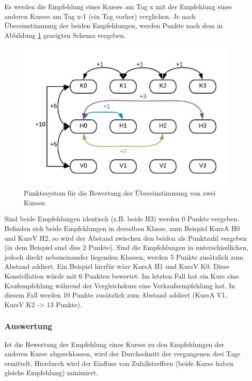 Es werden die Empfehlung eines Kurses am Tag x mit der Empfehlung eines anderen Kurses am Tag x-1 (ein Tag vorher) verglichen. Je nach Übereinstimmung der beiden Empfehlungen, werden Punkte nach dem in Abbildung \ref{fig:punktesystem} gezeigten Schema vergeben.

\begin{figure}[h]
\centering
\includegraphics[width=\linewidth]{kursvergleich/punktesystem}
\caption{Punktesystem für die Bewertung der Übereinstimmung von zwei Kursen}
\label{fig:punktesystem}
\end{figure}

Sind beide Empfehlungen identisch (z.B. beide H3) werden 0 Punkte vergeben. Befinden sich beide Empfehlungen in derselben Klasse, zum Beispiel KursA H0 und KursV H2, so wird der Abstand zwischen den beiden als Punktzahl vergeben (in dem Beispiel sind dies 2 Punkte). Sind die Empfehlungen in unterschiedlichen, jedoch direkt nebeneinander liegenden Klassen, werden 5 Punkte zusätzlich zum Abstand addiert. Ein Beispiel hierfür wäre KursA H1 und KursV K0. Diese Konstellation würde mit 6 Punkten bewertet. Im letzten Fall hat ein Kurs eine Kaufempfehlung während der Vergleichskurs eine Verkaufsempfehlung hat. In diesem Fall werden 10 Punkte zusätzlich zum Abstand addiert (KursA V1, KursV K2 -> 13 Punkte).

\subsubsection{Auswertung}
Ist die Bewertung der Empfehlung eines Kurses zu den Empfehlungen der anderen Kurse abgeschlossen, wird der Durchschnitt der vergangenen drei Tage ermittelt. Hierdurch wird der Einfluss von Zufallstreffern (beide Kurse haben gleiche Empfehlung) minimiert.

